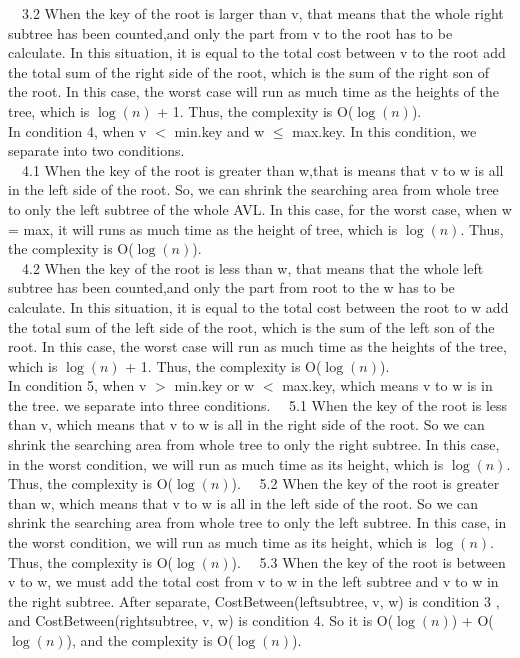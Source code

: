 \documentclass{assignment-263}
\begin{document}
\begin{enumerate}
\begin{enumerate}
\  \ 3.2 When the key of the root is larger than v, that means that the whole right subtree has been counted,and only the part from v to the root has to be calculate. In this situation, it is equal to the total cost between v to the root add the total sum of the right side of the root, which is the sum of the right son of the root. In this case, the worst case will run as much time as the heights of the tree, which is  $\log(n)$ + 1. Thus, the complexity is  O($\log(n)$).\\
In condition 4, when v $<$ min.key and w $\leq$ max.key. In this condition, we separate into two conditions.\\
\  \ 4.1 When the key of the root is greater than w,that is means that v to w is all in the left side of the root. So, we can shrink the searching area from whole tree to only the left subtree of the whole AVL. In this case, for the worst case, when w = max, it will runs as much time as the height of tree, which is $\log(n)$. Thus, the complexity is  O($\log(n)$). \\
\  \ 4.2 When the key of the root is less than w, that means that the whole left subtree has been counted,and only the part from root to the w has to be calculate. In this situation, it is equal to the total cost between the root to w add the total sum of the left side of the root, which is the sum of the left son of the root. In this case, the worst case will run as much time as the heights of the tree, which is  $\log(n)$ + 1. Thus, the complexity is  O($\log(n)$).\\
In condition 5, when  v $>$ min.key or w $<$ max.key, which means v to w is in the tree. we separate into three conditions.
\  \ 5.1 When the key of the root is less than v, which means that v to w is all in the right side of the root. So we can shrink the searching area from whole tree to only the right subtree. In this case, in the worst condition, we will run as much time as its height, which is $\log(n)$. Thus, the complexity is  O($\log(n)$).
\  \ 5.2 When the key of the root is greater than w, which means that v to w is all in the left side of the root. So we can shrink the searching area from whole tree to only the left subtree. In this case, in the worst condition, we will run as much time as its height, which is $\log(n)$. Thus, the complexity is  O($\log(n)$).
\   \ 5.3 When the key of the root is between v to w, we must add the total cost from v to w in the left subtree and v to w in the right subtree. After separate, CostBetween(leftsubtree, v, w) is condition 3 , and CostBetween(rightsubtree, v, w) is condition 4. So it is O($\log(n)$) + O($\log(n)$), and the complexity is O($\log(n)$).
\end{enumerate}





\end{enumerate}
\end{document}
